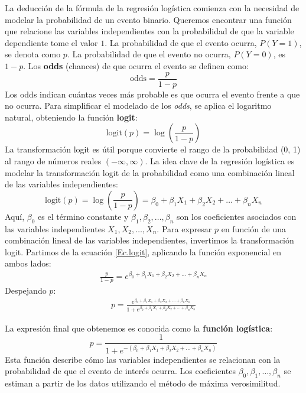 \documentclass[a4paper]{report} %
\begin{document}
La deducci\'on de la f\'ormula de la regresi\'on log\'istica comienza con la necesidad de modelar la probabilidad de un evento binario. Queremos encontrar una funci\'on que relacione las variables independientes con la probabilidad de que la variable dependiente tome el valor $1$. La probabilidad de que el evento ocurra, $P(Y=1)$, se denota como $p$. La probabilidad de que el evento no ocurra, $P(Y=0)$, es $1-p$. Los \textbf{odds} (chances) de que ocurra el evento se definen como:
\begin{equation}
\text{odds} = \frac{p}{1-p}
\end{equation}
Los odds indican cu\'antas veces m\'as probable es que ocurra el evento frente a que no ocurra. Para simplificar el modelado de los \textit{odds}, se aplica el logaritmo natural, obteniendo la funci\'on \textbf{logit}:
\begin{equation}
\text{logit}(p) = \log\left(\frac{p}{1-p}\right)
\end{equation}
La transformaci\'on logit es \'util porque convierte el rango de la probabilidad (0, 1) al rango de n\'umeros reales $\left(-\infty, \infty\right)$. La idea clave de la regresi\'on log\'istica es modelar la transformaci\'on logit de la probabilidad como una combinaci\'on lineal de las variables independientes:
\begin{equation}\label{Ec.logit}
\text{logit}(p) = \log\left(\frac{p}{1-p}\right) = \beta_0 + \beta_1 X_1 + \beta_2 X_2 + \ldots + \beta_n X_n
\end{equation}
Aqu\'i, $\beta_0$ es el t\'ermino constante y $\beta_1, \beta_2, \ldots, \beta_n$ son los coeficientes asociados con las variables independientes $X_1, X_2, \ldots, X_n$. Para expresar $p$ en funci\'on de una combinaci\'on lineal de las variables independientes, invertimos la transformaci\'on logit. Partimos de la ecuaci\'on \ref{Ec.logit}, aplicando la funci\'on exponencial en ambos lados:
\begin{eqnarray}
\frac{p}{1-p} = e^{\beta_0 + \beta_1 X_1 + \beta_2 X_2 + \ldots + \beta_n X_n}
\end{eqnarray}
Despejando $p$:
\begin{eqnarray}
p = \frac{e^{\beta_0 + \beta_1 X_1 + \beta_2 X_2 + \ldots + \beta_n X_n}}{1 + e^{\beta_0 + \beta_1 X_1 + \beta_2 X_2 + \ldots + \beta_n X_n}}
\end{eqnarray}

La expresi\'on final que obtenemos es conocida como la \textbf{funci\'on log\'istica}:
\begin{equation}\label{Eq.Logit1}
p = \frac{1}{1 + e^{-\left(\beta_0 + \beta_1 X_1 + \beta_2 X_2 + \ldots + \beta_n X_n\right)}}
\end{equation}
Esta funci\'on describe c\'omo las variables independientes se relacionan con la probabilidad de que el evento de inter\'es ocurra. Los coeficientes $\beta_0, \beta_1, \ldots, \beta_n$ se estiman a partir de los datos utilizando el m\'etodo de m\'axima verosimilitud.
\end{document}
